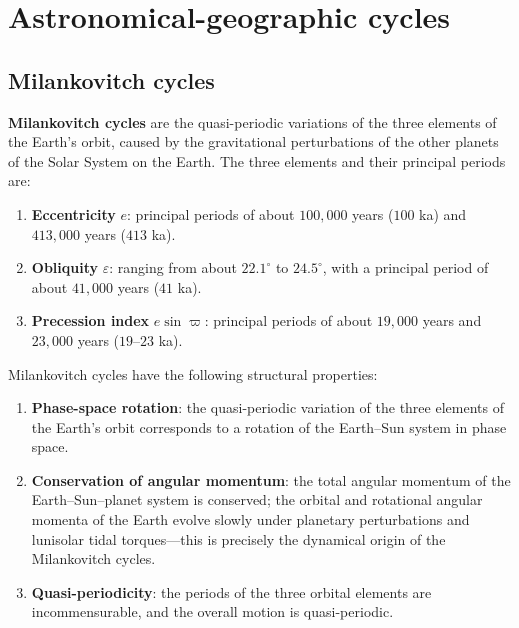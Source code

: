 \section{Astronomical-geographic cycles}
\label{sec:astro_geographic_cycles}

\subsection{Milankovitch cycles}

\begin{definition}\label{def:milankovitch_cycles}
\textbf{Milankovitch cycles} are the quasi-periodic variations of the three elements of the Earth's orbit, caused by the gravitational perturbations of the other planets of the Solar System on the Earth. The three elements and their principal periods are:
\begin{enumerate}[label=(\roman*)]
    \item \textbf{Eccentricity} $e$: principal periods of about $100,000$ years ($100$ ka) and $413,000$ years ($413$ ka).
    \item \textbf{Obliquity} $\varepsilon$: ranging from about $22.1^\circ$ to $24.5^\circ$, with a principal period of about $41,000$ years ($41$ ka).
    \item \textbf{Precession index} $e\sin\varpi$: principal periods of about $19,000$ years and $23,000$ years ($19$--$23$ ka).
\end{enumerate}
\end{definition}

\begin{proposition}\label{prop:milankovitch_structure}
Milankovitch cycles have the following structural properties:
\begin{enumerate}[label=(\roman*)]
    \item \textbf{Phase-space rotation}: the quasi-periodic variation of the three elements of the Earth's orbit corresponds to a rotation of the Earth--Sun system in phase space.
    \item \textbf{Conservation of angular momentum}: the total angular momentum of the Earth--Sun--planet system is conserved; the orbital and rotational angular momenta of the Earth evolve slowly under planetary perturbations and lunisolar tidal torques---this is precisely the dynamical origin of the Milankovitch cycles.
    \item \textbf{Quasi-periodicity}: the periods of the three orbital elements are incommensurable, and the overall motion is quasi-periodic.
\end{enumerate}
\end{proposition}

